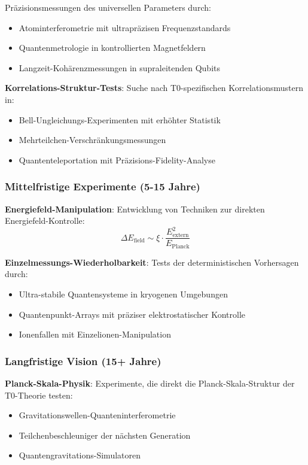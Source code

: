\documentclass[12pt,a4paper]{article}
\newcommand{\xipar}{\xi}
\theoremstyle{definition}
\theoremstyle{remark}
\begin{document}
Präzisionsmessungen des universellen Parameters durch:
\begin{itemize}
	\item Atominterferometrie mit ultrapräzisen Frequenzstandards
	\item Quantenmetrologie in kontrollierten Magnetfeldern
	\item Langzeit-Kohärenzmessungen in supraleitenden Qubits
\end{itemize}

\textbf{Korrelations-Struktur-Tests}:
Suche nach T0-spezifischen Korrelationsmustern in:
\begin{itemize}
	\item Bell-Ungleichungs-Experimenten mit erhöhter Statistik
	\item Mehrteilchen-Verschränkungsmessungen
	\item Quantenteleportation mit Präzisions-Fidelity-Analyse
\end{itemize}

\subsubsection{Mittelfristige Experimente (5-15 Jahre)}

\textbf{Energiefeld-Manipulation}:
Entwicklung von Techniken zur direkten Energiefeld-Kontrolle:
\begin{equation}
	\Delta E_{\text{field}} \sim \xipar \cdot \frac{E_{\text{extern}}^2}{E_{\text{Planck}}}
\end{equation}

\textbf{Einzelmessungs-Wiederholbarkeit}:
Tests der deterministischen Vorhersagen durch:
\begin{itemize}
	\item Ultra-stabile Quantensysteme in kryogenen Umgebungen
	\item Quantenpunkt-Arrays mit präziser elektrostatischer Kontrolle
	\item Ionenfallen mit Einzelionen-Manipulation
\end{itemize}

\subsubsection{Langfristige Vision (15+ Jahre)}

\textbf{Planck-Skala-Physik}:
Experimente, die direkt die Planck-Skala-Struktur der T0-Theorie testen:
\begin{itemize}
	\item Gravitationswellen-Quanteninterferometrie
	\item Teilchenbeschleuniger der nächsten Generation
	\item Quantengravitations-Simulatoren
\end{itemize}
\end{document}

